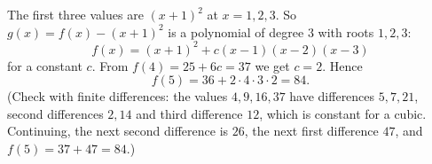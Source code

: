 The first three values are $(x+1)^2$ at $x=1,2,3$. So $g(x)=f(x)-(x+1)^2$ is a polynomial of degree $3$ with roots $1,2,3$:
\[
f(x)=(x+1)^2+c(x-1)(x-2)(x-3)
\]
for a constant $c$. From $f(4)=25+6c=37$ we get $c=2$. Hence
\[
f(5)=36+2\cdot4\cdot3\cdot2=\boxed{84}.
\]
(Check with finite differences: the values $4,9,16,37$ have differences $5,7,21$, second differences $2,14$ and third difference $12$, which is constant for a cubic. Continuing, the next second difference is $26$, the next first difference $47$, and $f(5)=37+47=84$.)
